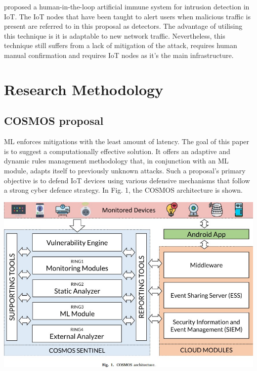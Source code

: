 \documentclass[12pt]{report}
\begin{document}
\cite{Brown} proposed a human-in-the-loop artificial immune system for intrusion detection in IoT. The IoT nodes that have been taught to alert users when malicious traffic is present are referred to in this proposal as detectors. The advantage of utilising this technique is it is adaptable to new network traffic. Nevertheless, this technique still suffers from a lack of mitigation of the attack, requires human manual confirmation and requires IoT nodes as it’s the main infrastructure.\\ 



\section{Research Methodology}

\subsection{COSMOS proposal}
ML enforces mitigations with the least amount of latency. The goal of this paper is to suggest a computationally effective solution. It offers an adaptive and dynamic rules management methodology that, in conjunction with an ML module, adapts itself to previously unknown attacks. Such a proposal's primary objective is to defend IoT devices using various defensive mechanisms that follow a strong cyber defence strategy. In Fig. 1, the COSMOS architecture is shown. \\
\begin{center}
\includegraphics[scale=0.6]{Fig1.jpg}\\
\end{center}
\end{document}
